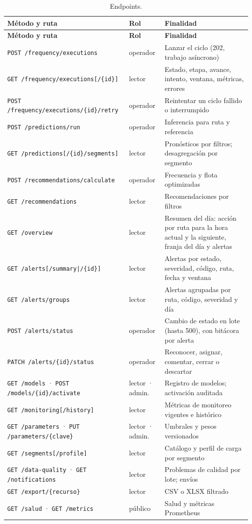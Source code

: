 \documentclass[10pt,a4paper]{article}
\newcommand{\cod}[1]{\texttt{\small #1}}
\begin{document}
\begin{longtable}{@{}p{}p{}p{}@{}}
\caption{Endpoints.}\\
\toprule
\textbf{Método y ruta} & \textbf{Rol} & \textbf{Finalidad} \\
\midrule
\endfirsthead
\toprule
\textbf{Método y ruta} & \textbf{Rol} & \textbf{Finalidad} \\
\midrule
\endhead
\cod{POST /frequency/executions} & operador & Lanzar el ciclo (202, trabajo asíncrono) \\
\cod{GET /frequency/executions[/\{id\}]} & lector & Estado, etapa, avance, intento, ventana, métricas, errores \\
\cod{POST /frequency/executions/\{id\}/retry} & operador & Reintentar un ciclo fallido o interrumpido \\
\cod{POST /predictions/run} & operador & Inferencia para ruta y referencia \\
\cod{GET /predictions[/\{id\}/segments]} & lector & Pronósticos por filtros; desagregación por segmento \\
\cod{POST /recommendations/calculate} & operador & Frecuencia y flota optimizadas \\
\cod{GET /recommendations} & lector & Recomendaciones por filtros \\
\cod{GET /overview} & lector & Resumen del día: acción por ruta para la hora actual y la siguiente, franja del día y alertas \\
\cod{GET /alerts[/summary|/\{id\}]} & lector & Alertas por estado, severidad, código, ruta, fecha y ventana \\
\cod{GET /alerts/groups} & lector & Alertas agrupadas por ruta, código, severidad y día \\
\cod{POST /alerts/status} & operador & Cambio de estado en lote (hasta 500), con bitácora por alerta \\
\cod{PATCH /alerts/\{id\}/status} & operador & Reconocer, asignar, comentar, cerrar o descartar \\
\cod{GET /models} · \cod{POST /models/\{id\}/activate} & lector · admin. & Registro de modelos; activación auditada \\
\cod{GET /monitoring[/history]} & lector & Métricas de monitoreo vigentes e histórico \\
\cod{GET /parameters} · \cod{PUT /parameters/\{clave\}} & lector · admin. & Umbrales y pesos versionados \\
\cod{GET /segments[/profile]} & lector & Catálogo y perfil de carga por segmento \\
\cod{GET /data-quality} · \cod{GET /notifications} & lector & Problemas de calidad por lote; envíos \\
\cod{GET /export/\{recurso\}} & lector & CSV o XLSX filtrado \\
\cod{GET /salud} · \cod{GET /metrics} & público & Salud y métricas Prometheus \\
\bottomrule
\end{longtable}
\end{document}
